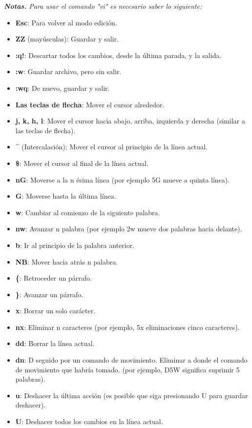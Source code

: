 \documentclass{article}
\begin{document}
\textit{\textbf{Notas.} Para usar el comando "vi" es necesario saber lo siguiente:}
\begin{itemize}

\item\textbf{Esc}: Para volver al modo edición.
\item\textbf{ZZ} (mayúsculas): Guardar y salir.
\item\textbf{:q!}: Descartar todos los cambios, desde la última parada, y la salida.
\item\textbf{:w}: Guardar archivo, pero sin salir.
\item\textbf{:wq}: De nuevo, guardar y salir.
\item\textbf{Las teclas de flecha}: Mover el cursor alrededor.
\item\textbf{j, k, h, l}: Mover el cursor hacia abajo, arriba, izquierda y derecha (similar a las teclas de flecha).
\item\textbf{\^} (Intercalación): Mover el cursor al principio de la línea actual.
\item\textbf{\$}: Mover el cursor al final de la línea actual.
\item\textbf{nG}: Moverse a la n ésima línea (por ejemplo 5G mueve a quinta línea).
\item\textbf{G}: Moverse hasta la última línea.
\item\textbf{w}: Cambiar al comienzo de la siguiente palabra.
\item\textbf{nw}: Avanzar n palabra (por ejemplo 2w mueve dos palabras hacia delante).
\item\textbf{b}: Ir al principio de la palabra anterior.
\item\textbf{NB}: Mover hacia atrás n palabra.
\item\textbf{\{}: Retroceder un párrafo.
\item\textbf{\}}: Avanzar un párrafo.
\item\textbf{x}: Borrar un solo carácter.
\item\textbf{nx}: Eliminar n caracteres (por ejemplo, 5x eliminaciones cinco caracteres).
\item\textbf{dd}: Borrar la línea actual.
\item\textbf{dn}: D seguido por un comando de movimiento. Eliminar a donde el comando de movimiento que habría tomado. (por ejemplo, D5W significa suprimir 5 palabras).
\item\textbf{u}: Deshacer la última acción (es posible que siga presionando U para guardar deshacer).
\item\textbf{U}: Deshacer todos los cambios en la línea actual.

\end{itemize}
\end{document}
